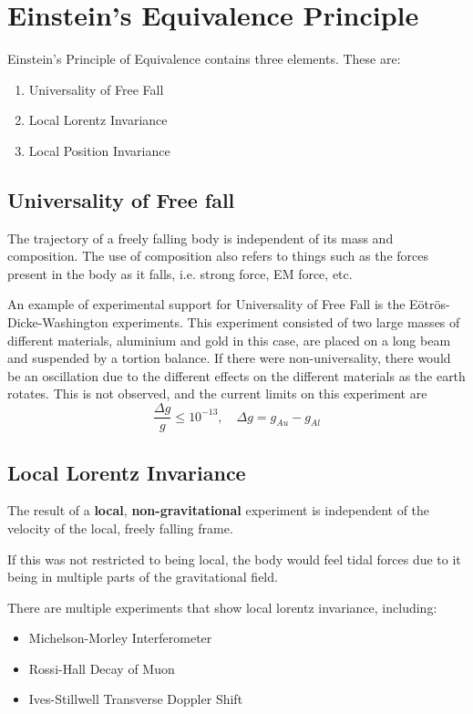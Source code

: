 \setchapterpreamble[u]{\margintoc}
\chapter{Einstein's Equivalence Principle}
Einstein's Principle of Equivalence contains three elements. These are:
\begin{enumerate}
    \item Universality of Free Fall
    \item Local Lorentz Invariance
    \item Local Position Invariance
\end{enumerate}
\section{Universality of Free fall}
The trajectory of a freely falling body is independent of its mass and composition. The use of composition also refers to things such as the forces present in the body as it falls, i.e. strong force, EM force, etc. \par An example of experimental support for Universality of Free Fall is the Eötrös-Dicke-Washington experiments. This experiment consisted of two large masses of different materials, aluminium and gold in this case, are placed on a long beam and suspended by a tortion balance. If there were non-universality, there would be an oscillation due to the different effects on the different materials as the earth rotates. This is not observed, and the current limits on this experiment are $$\frac{\Delta g}{g} \leq 10^{-13}, \quad \Delta g = g_{Au} - g_{Al}$$
\section{Local Lorentz Invariance}
The result of a \textbf{local}, \textbf{non-gravitational} experiment is independent of the velocity of the local, freely falling frame. \par If this was not restricted to being local, the body would feel tidal forces due to it being in multiple parts of the gravitational field. \par There are multiple experiments that show local lorentz invariance, including:
\begin{itemize}
    \item Michelson-Morley Interferometer
    \item Rossi-Hall Decay of Muon
    \item Ives-Stillwell Transverse Doppler Shift
\end{itemize}
